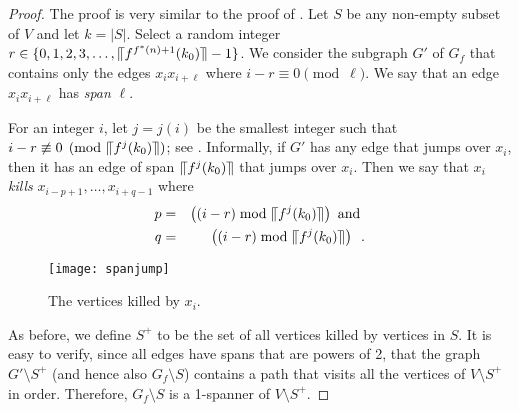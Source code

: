 \documentclass{patmorin}
\newcommand{\upen}[1]{\llceil#1\rrceil}
\begin{document}
\begin{proof}
  The proof is very similar to the proof of .  Let $S$ be
  any non-empty subset of $V$ and let $k=|S|$.   Select a random integer
  $r\in\{0,1,2,3,\ldots,\upen{f^{f^*(n)+1}(k_0)}-1\}$.  We consider the
  subgraph $G'$ of $G_f$ that contains only the edges $x_ix_{i+\ell}$
  where $i-r\equiv 0\pmod{\ell}$.  We say that an edge $x_ix_{i+\ell}$
  has \emph{span} $\ell$.

  For an integer $i$, let $j=j(i)$ be the smallest integer such that
  $i-r\not\equiv 0\pmod{\upen{f^j(k_0)}}$; see .
  Informally, if $G'$ has any edge that jumps over $x_i$, then it has an
  edge of span $\upen{f^j(k_0)}$ that jumps over $x_i$.  Then we say that
   $x_i$ \emph{kills} $x_{i-p+1},\ldots,x_{i+q-1}$ where
  \begin{eqnarray*}
     p&=& \left((i-r) \bmod \upen{f^j(k_0)}\right) \text{ and } \\
     q&=& \left((i-r) \bmod \upen{f^j(k_0)}\right) \enspace .
  \end{eqnarray*}
  \begin{figure}
    \begin{center}
      \texttt{[image: spanjump]}
    \end{center}
    \caption{The vertices killed by $x_i$.}
  \end{figure}
  As before, we define $S^+$ to be the set of all vertices killed by
  vertices in $S$.  It is easy to verify, since all edges have
  spans that are powers of 2, that the graph $G'\setminus S^+$ (and hence
  also $G_f\setminus S$) contains a path that visits all the vertices of
  $V\setminus S^+$ in order.  Therefore, $G_f\setminus S$ is a 1-spanner
  of $V\setminus S^+$.


\end{proof}
\end{document}
